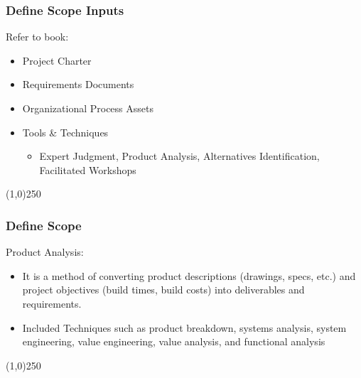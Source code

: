 \begin{frame}
\frametitle{Define Scope \hfill Inputs}
Refer to book:
\begin{itemize}
	\item Project Charter
	\item Requirements Documents
	\item Organizational Process Assets
	\item Tools \& Techniques
	\begin{itemize}
		\item Expert Judgment, Product Analysis, Alternatives Identification, Facilitated Workshops
	\end{itemize}
\end{itemize}
\end{frame}\begin{center}\line(1,0){250}\end{center}



\begin{frame}
\frametitle{Define Scope}
Product Analysis:
\begin{itemize}
	\item  It is a method of converting product descriptions (drawings, specs, etc.) and project objectives (build times, build costs) into deliverables and requirements.
	\item Included Techniques such as product breakdown, systems analysis, system engineering, value engineering, value analysis, and functional analysis
\end{itemize}
\end{frame}\begin{center}\line(1,0){250}\end{center}



